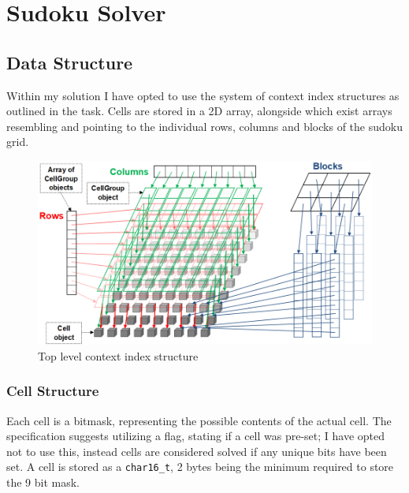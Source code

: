 \section{Sudoku Solver}
    \subsection*{Data Structure}
        Within my solution I have opted to use the system of context index
        structures as outlined in the task. Cells are stored in a 2D array,
        alongside which exist arrays resembling and pointing to the individual
        rows, columns and blocks of the sudoku grid.

        \begin{figure}[H]
            \includegraphics[width=\textwidth]{../README-fig3.png}
            \caption{Top level context index structure}
        \end{figure}

        \subsubsection*{Cell Structure}
            Each cell is a bitmask, representing the possible contents of the actual cell.
            The specification suggests utilizing a flag, stating if a cell was pre-set;
            I have opted not to use this, 
            instead cells are considered solved if any unique bits have been set.
            A cell is stored as a \texttt{char16_t}, 
            2 bytes being the minimum required to store the 9 bit mask.

